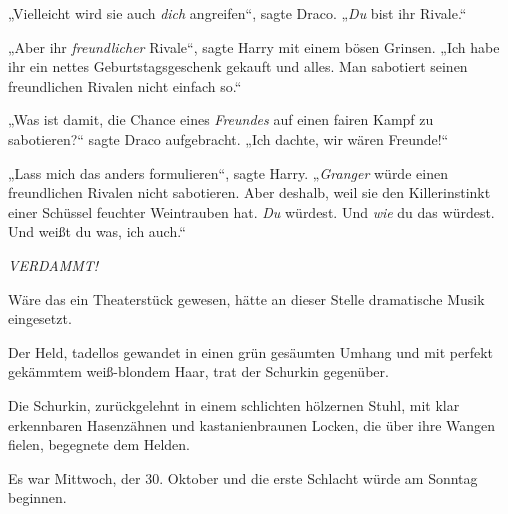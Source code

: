 „Vielleicht wird sie auch \emph{dich} angreifen“, sagte Draco.
„\emph{Du} bist ihr Rivale.“

„Aber ihr \emph{freundlicher} Rivale“, sagte Harry mit einem bösen Grinsen.
„Ich habe ihr ein nettes Geburtstagsgeschenk gekauft und alles. Man sabotiert seinen freundlichen Rivalen nicht einfach so.“

„Was ist damit, die Chance eines \emph{Freundes} auf einen fairen Kampf zu sabotieren?“ sagte Draco aufgebracht.
„Ich dachte, wir wären Freunde!“

„Lass mich das anders formulieren“, sagte Harry.
„\emph{Granger} würde einen freundlichen Rivalen nicht sabotieren. Aber deshalb, weil sie den Killerinstinkt einer Schüssel feuchter Weintrauben hat. \emph{Du} würdest. Und \emph{wie} du das würdest. Und weißt du was, ich auch.“

\emph{VERDAMMT!}

\later

Wäre das ein Theaterstück gewesen, hätte an dieser Stelle dramatische Musik eingesetzt.

Der Held, tadellos gewandet in einen grün gesäumten Umhang und mit perfekt gekämmtem weiß-blondem Haar, trat der Schurkin gegenüber.

Die Schurkin, zurückgelehnt in einem schlichten hölzernen Stuhl, mit klar erkennbaren Hasenzähnen und kastanienbraunen Locken, die über ihre Wangen fielen, begegnete dem Helden.

Es war Mittwoch, der 30. Oktober und die erste Schlacht würde am Sonntag beginnen.

